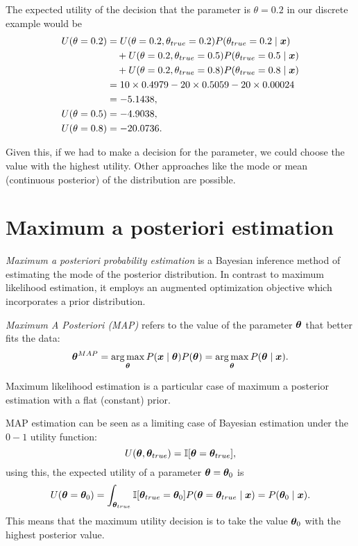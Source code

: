 The expected utility of the decision that the parameter is \(\theta = 0.2\)
in our discrete example would be
\[
  \begin{aligned}
  U(\theta = 0.2) &= U(\theta = 0.2, \theta_{true} = 0.2)P(\theta_{true} = 0.2  \mid
  \bm{x})\\
  &\quad+ U(\theta = 0.2, \theta_{true} = 0.5)P(\theta_{true} = 0.5  \mid
  \bm{x}) \\
  &\quad+  U(\theta = 0.2, \theta_{true} = 0.8)P(\theta_{true} = 0.8  \mid  \bm{x})\\
  &= 10 \times 0.4979 - 20\times 0.5059 -20 \times 0.00024 \\
  &= -5.1438,\\
  U(\theta = 0.5) &= -4.9038, \\
  U(\theta = 0.8) &= -20.0736.
\end{aligned}
\]

Given this, if we had to make a decision for the parameter, we could choose the value with the highest utility. Other approaches like the mode or mean (continuous posterior) of the distribution are possible.

\section{Maximum a posteriori estimation}

\emph{Maximum a posteriori probability estimation} is a Bayesian inference method of estimating the mode of the posterior distribution. In contrast to maximum likelihood estimation, it employs an augmented optimization objective which incorporates a prior distribution.

\begin{definition}
  \emph{Maximum A Posteriori (MAP)} refers to the value of the parameter \( \bm{\theta} \) that better fits the data:
  \[
    \bm{\theta}^{MAP} = \operatorname*{arg\,max}_{\bm{\theta}} P(\bm{x} \mid \bm{\theta})P(\bm{\theta}) = \operatorname*{arg\,max}_{\bm{\theta}} P(\bm{\theta} \mid \bm{x}).
  \]
\end{definition}

\begin{remark}
  Maximum likelihood estimation is a particular case of maximum a posterior estimation with a flat (constant) prior.
\end{remark}

\begin{remark}
  MAP estimation can be seen as a limiting case of Bayesian estimation under the \(0-1\)  utility function:
  \[
    U(\bm{\theta}, \bm{\theta}_{true}) = \mathbb{I}[\bm{\theta} = \bm{\theta}_{true}],
  \]
  using this, the expected utility of a parameter \(\bm{\theta} = \bm{\theta}_0\) is
  \[
    U(\bm{\theta} = \bm{\theta}_0) = \int_{\bm{\theta}_{true}}\mathbb{I}[\bm{\theta}_{true} = \bm{\theta}_0]P(\bm{\theta} = \bm{\theta}_{true}  \mid  \bm{x}) = P(\bm{\theta}_0  \mid  \bm{x}).
  \]
  This means that the maximum utility decision is to take the value \(\bm{\theta}_0\) with the highest posterior value.
\end{remark}

